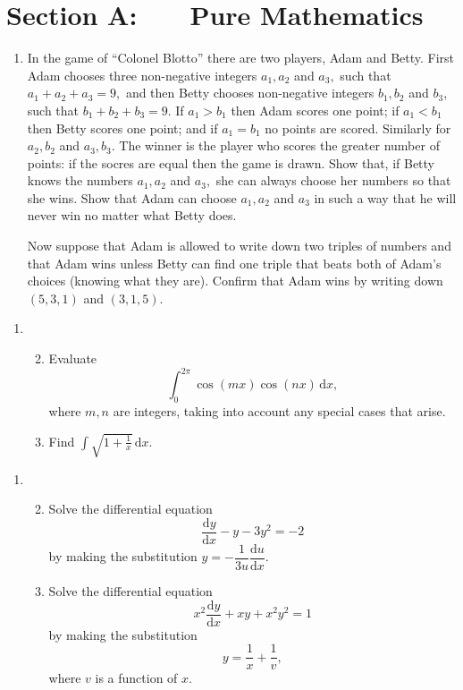 \documentclass[a4, 11pt]{report}
\newlength{\qspace}
\newcounter{qnumber}
\newenvironment{question}%
 {\vspace{\qspace}
  \begin{enumerate}[\bfseries 1\quad][10]%
    \setcounter{enumi}{\value{qnumber}}%
    \item%
 }
{
  \end{enumerate}
  \filbreak
  \stepcounter{qnumber}
 }
\newenvironment{questionparts}[1][1]%
 {
  \begin{enumerate}[\bfseries (i)]%
    \setcounter{enumii}{#1}
    \addtocounter{enumii}{-1}
    \setlength{\itemsep}{5mm}
    \setlength{\parskip}{8pt}
 }
 {
  \end{enumerate}
 }
\begin{document}
\setcounter{page}{2}

 
\section*{Section A: \ \ \ Pure Mathematics}

\begin{question}
In the game of ``Colonel Blotto'' there are two players, Adam and
Betty. First Adam chooses three non-negative integers $a_{1},a_{2}$
and $a_{3},$ such that $a_{1}+a_{2}+a_{3}=9,$ and then Betty chooses
non-negative integers $b_{1},b_{2}$ and $b_{3}$, such that $b_{1}+b_{2}+b_{3}=9.$
If $a_{1}>b_{1}$ then Adam scores one point; if $a_{1}<b_{1}$ then
Betty scores one point; and if $a_{1}=b_{1}$ no points are scored.
Similarly for $a_{2},b_{2}$ and $a_{3},b_{3}.$ The winner is the
player who scores the greater number of points: if the socres are
equal then the game is drawn. Show that, if Betty knows the numbers
$a_{1},a_{2}$ and $a_{3},$ she can always choose her numbers so
that she wins. Show that Adam can choose $a_{1},a_{2}$ and $a_{3}$
in such a way that he will never win no matter what Betty does. 


Now suppose that Adam is allowed to write down two triples of numbers
and that Adam wins unless Betty can find one triple that beats both
of Adam's choices (knowing what they are). Confirm that Adam wins
by writing down $(5,3,1)$ and $(3,1,5).$ 
\end{question}

\begin{question}
\begin{questionparts} 
	\item
Evaluate 
\[
\int_{0}^{2\pi}\cos(mx)\cos(nx)\,\mathrm{d}x,
\]
where $m,n$ are integers, taking into account any special cases that
arise. 


\item Find ${\displaystyle \int\sqrt{1+\frac{1}{x}}\,\mathrm{d}x}.$
\end{questionparts}
\end{question}

\begin{question}
\begin{questionparts}
\item Solve the differential equation 
\[
\frac{\mathrm{d}y}{\mathrm{d}x}-y-3y^{2}=-2
\]
by making the substitution $y=-\dfrac{1}{3u}\dfrac{\mathrm{d}u}{\mathrm{d}x}.$


\item Solve the differential equation 
\[
x^{2}\frac{\mathrm{d}y}{\mathrm{d}x}+xy+x^{2}y^{2}=1
\]
by making the substitution 
\[
y=\frac{1}{x}+\frac{1}{v},
\]
where $v$ is a function of $x$. 
\end{questionparts}
\end{question}
\end{document}
